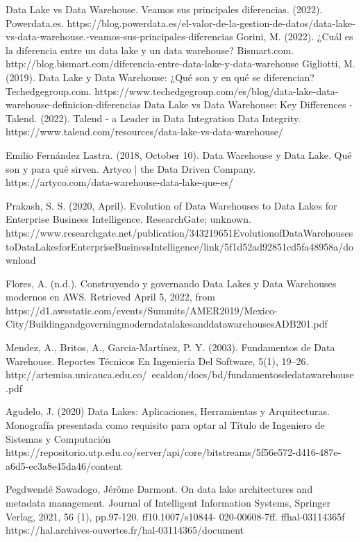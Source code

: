 \documentclass[twoside,twocolumn]{article}
\begin{document}
 
 


\begin{thebibliography}{}

    Data Lake vs Data Warehouse. Veamos sus principales diferencias. (2022). Powerdata.es. https://blog.powerdata.es/el-valor-de-la-gestion-de-datos/data-lake-vs-data-warehouse.-veamos-sus-principales-diferencias
   Gorini, M. (2022). ¿Cuál es la diferencia entre un data lake y un data warehouse? Bismart.com. http://blog.bismart.com/diferencia-entre-data-lake-y-data-warehouse
   Gigliotti, M. (2019). Data Lake y Data Warehouse: ¿Qué son y en qué se diferencian? Techedgegroup.com. https://www.techedgegroup.com/es/blog/data-lake-data-warehouse-definicion-diferencias
   Data Lake vs Data Warehouse: Key Differences - Talend. (2022). Talend - a Leader in Data Integration Data Integrity. https://www.talend.com/resources/data-lake-vs-data-warehouse/
  
    Emilio Fernández Lastra. (2018, October 10). Data Warehouse y Data Lake. Qué son y para qué sirven. Artyco | the Data Driven Company. https://artyco.com/data-warehouse-data-lake-que-es/
    
   Prakash, S. S. (2020, April). Evolution of Data Warehouses to Data Lakes for Enterprise Business Intelligence. ResearchGate; unknown. https://www.researchgate.net/publication/343219651EvolutionofDataWarehousestoDataLakesforEnterpriseBusinessIntelligence/link/5f1d52ad92851cd5fa48958a/download
   
  Flores, A. (n.d.). Construyendo y governando Data Lakes y Data Warehouses modernos en AWS. Retrieved April 5, 2022, from https://d1.awsstatic.com/events/Summits/AMER2019/Mexico-City/BuildingandgoverningmoderndatalakesanddatawarehousesADB201.pdf
   
   Mendez, A., Britos, A.,  Garcia-Martínez, P. Y. (2003). Fundamentos de Data Warehouse. Reportes Técnicos En Ingeniería Del Software, 5(1), 19–26. http://artemisa.unicauca.edu.co/~ecaldon/docs/bd/fundamentosdedatawarehouse.pdf
    
    Agudelo, J. (2020) Data Lakes: Aplicaciones, Herramientas y Arquitecturas. Monografía presentada como requisito para optar al Título de Ingeniero de Sistemas y Computación https://repositorio.utp.edu.co/server/api/core/bitstreams/5f56e572-d416-487e-a6d5-ec3a8e45da46/content
 
	Pegdwendé Sawadogo, Jérôme Darmont. On data lake architectures and metadata management. Journal of Intelligent Information Systems, Springer Verlag, 2021, 56 (1), pp.97-120. ff10.1007/s10844- 020-00608-7ff. ffhal-03114365f https://hal.archives-ouvertes.fr/hal-03114365/document


 
    \end{thebibliography}


\end{document}
